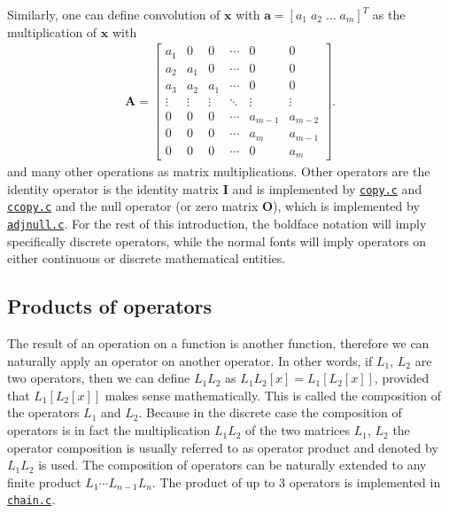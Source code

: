 Similarly, one can define  convolution of $\mathbf{x}$ with $\mathbf{a}=[a_1\;a_2\;\dots\;a_m]^T$ as the multiplication of $\mathbf{x}$ with 
\begin{gather*}
    \mathbf{A} = \begin{bmatrix} a_1 &  0  &  0  & \cdots &  0  &  0\\
                                 a_2 & a_1 &  0  & \cdots &  0  &  0\\
                                 a_3 & a_2 & a_1 & \cdots &  0  &  0\\
                                 \vdots & \vdots & \vdots & \ddots & \vdots & \vdots\\
                                  0  &  0  &  0  & \cdots & a_{m-1} & a_{m-2} \\ 
                                  0  &  0  &  0  & \cdots & a_m & a_{m-1} \\ 
                                  0  &  0  &  0  & \cdots &  0  & a_m
                 \end{bmatrix}. 
\end{gather*}
and many other operations as matrix multiplications. Other operators are the identity operator is the identity matrix $\mathbf{I}$ and is implemented by \hyperref[sec:copy]{\texttt{copy.c}} and \hyperref[sec:ccopy]{\texttt{ccopy.c}} and the null operator (or zero matrix $\mathbf{O}$), which is implemented by \hyperref[sec:adjnull]{\texttt{adjnull.c}}. For the rest of this introduction, the boldface notation will imply specifically discrete operators, while the normal fonts will imply operators on either continuous or discrete mathematical entities.

\subsection{Products of operators}
The result of an operation on a function is another function, therefore we can naturally apply an operator on another operator. In other words, if $L_1$, $L_2$ are two operators, then we can define $L_1L_2$ as $L_1L_2[x] = L_1[L_2[x]]$, provided that $L_1[L_2[x]]$ makes sense mathematically. This is called the composition of the operators $L_1$ and $L_2$. Because in the discrete case the composition of operators is in fact the multiplication $L_1L_2$ of the two matrices $L_1$, $L_2$ the operator composition is usually referred to as operator product and denoted by $L_1L_2$ is used. The composition of operators can be naturally extended to any finite product $L_1\cdots L_{n-1}L_n$. The product of up to 3 operators is implemented in \hyperref[sec:chain]{\texttt{chain.c}}.

